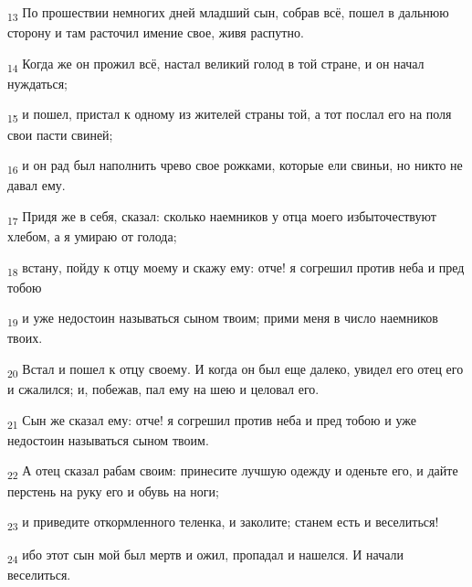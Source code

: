 \begin{tcolorbox}
\textsubscript{13} По прошествии немногих дней младший сын, собрав всё, пошел в дальнюю сторону и там расточил имение свое, живя распутно.
\end{tcolorbox}
\begin{tcolorbox}
\textsubscript{14} Когда же он прожил всё, настал великий голод в той стране, и он начал нуждаться;
\end{tcolorbox}
\begin{tcolorbox}
\textsubscript{15} и пошел, пристал к одному из жителей страны той, а тот послал его на поля свои пасти свиней;
\end{tcolorbox}
\begin{tcolorbox}
\textsubscript{16} и он рад был наполнить чрево свое рожками, которые ели свиньи, но никто не давал ему.
\end{tcolorbox}
\begin{tcolorbox}
\textsubscript{17} Придя же в себя, сказал: сколько наемников у отца моего избыточествуют хлебом, а я умираю от голода;
\end{tcolorbox}
\begin{tcolorbox}
\textsubscript{18} встану, пойду к отцу моему и скажу ему: отче! я согрешил против неба и пред тобою
\end{tcolorbox}
\begin{tcolorbox}
\textsubscript{19} и уже недостоин называться сыном твоим; прими меня в число наемников твоих.
\end{tcolorbox}
\begin{tcolorbox}
\textsubscript{20} Встал и пошел к отцу своему. И когда он был еще далеко, увидел его отец его и сжалился; и, побежав, пал ему на шею и целовал его.
\end{tcolorbox}
\begin{tcolorbox}
\textsubscript{21} Сын же сказал ему: отче! я согрешил против неба и пред тобою и уже недостоин называться сыном твоим.
\end{tcolorbox}
\begin{tcolorbox}
\textsubscript{22} А отец сказал рабам своим: принесите лучшую одежду и оденьте его, и дайте перстень на руку его и обувь на ноги;
\end{tcolorbox}
\begin{tcolorbox}
\textsubscript{23} и приведите откормленного теленка, и заколите; станем есть и веселиться!
\end{tcolorbox}
\begin{tcolorbox}
\textsubscript{24} ибо этот сын мой был мертв и ожил, пропадал и нашелся. И начали веселиться.
\end{tcolorbox}

